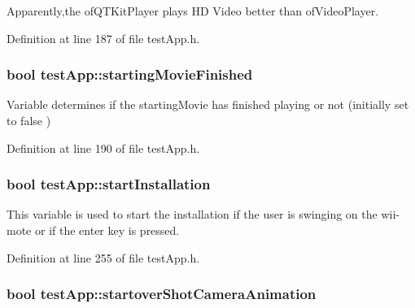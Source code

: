 Apparently,the of\-Q\-T\-Kit\-Player plays H\-D Video better than of\-Video\-Player. 



Definition at line 187 of file test\-App.\-h.

\hypertarget{classtest_app_aea3cb9f5f0061a42a4953d6b6c949036}{
\subsubsection[{starting\-Movie\-Finished}]{\setlength{\rightskip}{0pt plus 5cm}bool test\-App\-::starting\-Movie\-Finished}}\label{classtest_app_aea3cb9f5f0061a42a4953d6b6c949036}


Variable determines if the starting\-Movie has finished playing or not (initially set to false ) 



Definition at line 190 of file test\-App.\-h.

\hypertarget{classtest_app_a8a65a6d1a473417cec1c2ac2e6116aae}{
\subsubsection[{start\-Installation}]{\setlength{\rightskip}{0pt plus 5cm}bool test\-App\-::start\-Installation}}\label{classtest_app_a8a65a6d1a473417cec1c2ac2e6116aae}


This variable is used to start the installation if the user is swinging on the wii-\/mote or if the enter key is pressed. 



Definition at line 255 of file test\-App.\-h.

\hypertarget{classtest_app_ad2fca6ce5e37462cd820afc48633324d}{
\subsubsection[{startover\-Shot\-Camera\-Animation}]{\setlength{\rightskip}{0pt plus 5cm}bool test\-App\-::startover\-Shot\-Camera\-Animation}}\label{classtest_app_ad2fca6ce5e37462cd820afc48633324d}



